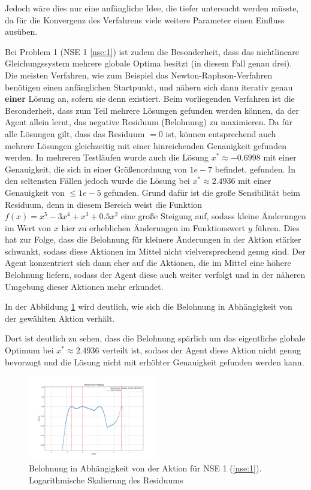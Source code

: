 \documentclass{article}
\theoremstyle{newline}
\begin{document}
\begin{onehalfspace}
Jedoch wäre dies nur eine anfängliche Idee, die tiefer untersucht werden müsste, da für die Konvergenz des Verfahrens viele weitere Parameter einen Einfluss ausüben.
\medskip

Bei Problem 1 (NSE 1 \ref{nse:1}) ist zudem die Besonderheit, dass das nichtlineare Gleichungssystem mehrere globale Optima besitzt (in diesem Fall genau drei). Die meisten Verfahren, wie zum Beispiel das Newton-Raphson-Verfahren benötigen einen anfänglichen Startpunkt, und nähern sich dann iterativ genau \textbf{einer} Lösung an, sofern sie denn existiert. Beim vorliegenden Verfahren ist die Besonderheit, dass zum Teil mehrere Lösungen gefunden werden können, da der Agent allein lernt, das negative Residuum (Belohnung) zu maximieren. Da für alle Lösungen gilt, dass das Residuum $= 0$ ist, können entsprechend auch mehrere Lösungen gleichzeitig mit einer hinreichenden Genauigkeit gefunden werden. In mehreren Testläufen wurde auch die Lösung $x^{\ast} \approx -0.6998$ mit einer Genauigkeit, die sich in einer Größenordnung von $1e-7$ befindet, gefunden. In den seltensten Fällen jedoch wurde die Lösung bei $x^{\ast} \approx 2.4936$ mit einer Genauigkeit von $\leq 1e-5$ gefunden. Grund dafür ist die große Sensibilität beim Residuum, denn in diesem Bereich weist die Funktion $f(x) = x^5 - 3x^4+x^3+0.5x^2$ eine große Steigung auf, sodass kleine Änderungen im Wert von $x$ hier zu erheblichen Änderungen im Funktionswert $y$ führen. Dies hat zur Folge, dass die Belohnung für kleinere Änderungen in der Aktion stärker schwankt, sodass diese Aktionen im Mittel nicht vielversprechend genug sind. Der Agent konzentriert sich dann eher auf die Aktionen, die im Mittel eine höhere Belohnung liefern, sodass der Agent diese auch weiter verfolgt und in der näheren Umgebung dieser Aktionen mehr erkundet.

In der Abbildung \ref{fig:reward-action-nse1-logscale} wird deutlich, wie sich die Belohnung in Abhängigkeit von der gewählten Aktion verhält.

Dort ist deutlich zu sehen, dass die Belohnung spärlich um das eigentliche globale Optimum bei $x^{\ast} \approx 2.4936$ verteilt ist, sodass der Agent diese Aktion nicht genug bevorzugt und die Lösung nicht mit erhöhter Genauigkeit gefunden werden kann.

\begin{figure}[h]
	\centering
	\includegraphics[width=0.5\textwidth]{Bilder/reward_action_nse1_logscale.png}
	\caption{Belohnung in Abhängigkeit von der Aktion für NSE 1 (\ref{nse:1}). Logarithmische Skalierung des Residuums}
	\label{fig:reward-action-nse1-logscale}
\end{figure}
\medskip


\end{onehalfspace}
\end{document}
